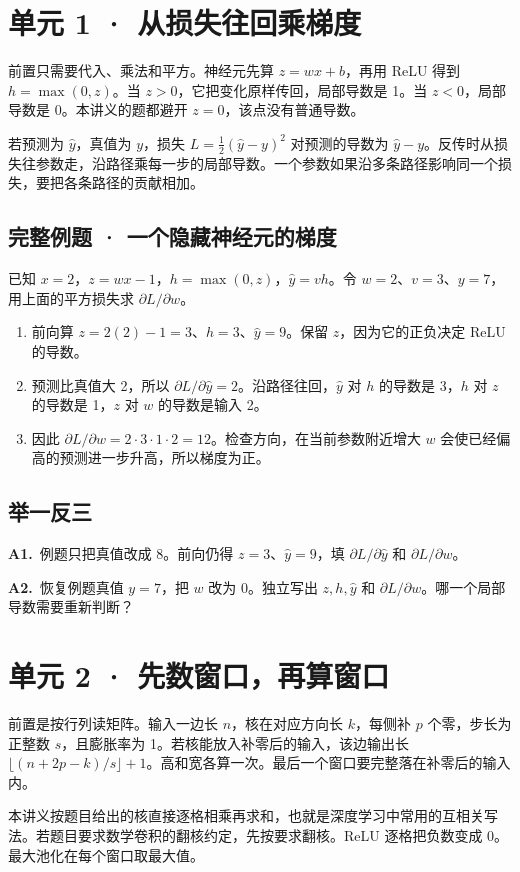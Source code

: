 \documentclass[UTF8,a4paper,11pt]{ctexart}
\newcommand{\PracticeQuestion}[3]{\par\Needspace{4\baselineskip}\noindent\begin{minipage}{\linewidth}\textbf{#1.}\ #2\par\noindent\rule{0pt}{#3mm}\par\end{minipage}\par}
\begin{document}
\clearpage
\section{单元 1 · 从损失往回乘梯度}
前置只需要代入、乘法和平方。神经元先算 $z=wx+b$，再用 ReLU 得到 $h=\max(0,z)$。当 $z>0$，它把变化原样传回，局部导数是 1。当 $z<0$，局部导数是 0。本讲义的题都避开 $z=0$，该点没有普通导数。

若预测为 $\hat y$，真值为 $y$，损失 $L=\frac12(\hat y-y)^2$ 对预测的导数为 $\hat y-y$。反传时从损失往参数走，沿路径乘每一步的局部导数。一个参数如果沿多条路径影响同一个损失，要把各条路径的贡献相加。

\subsection{完整例题 · 一个隐藏神经元的梯度}
已知 $x=2$，$z=wx-1$，$h=\max(0,z)$，$\hat y=vh$。令 $w=2$、$v=3$、$y=7$，用上面的平方损失求 $\partial L/\partial w$。

\begin{enumerate}
\item 前向算 $z=2(2)-1=3$、$h=3$、$\hat y=9$。保留 $z$，因为它的正负决定 ReLU 的导数。
\item 预测比真值大 2，所以 $\partial L/\partial\hat y=2$。沿路径往回，$\hat y$ 对 $h$ 的导数是 3，$h$ 对 $z$ 的导数是 1，$z$ 对 $w$ 的导数是输入 2。
\item 因此 $\partial L/\partial w=2\cdot3\cdot1\cdot2=12$。检查方向，在当前参数附近增大 $w$ 会使已经偏高的预测进一步升高，所以梯度为正。
\end{enumerate}
\subsection{举一反三}
\PracticeQuestion{A1}{例题只把真值改成 8。前向仍得 $z=3$、$\hat y=9$，填 $\partial L/\partial\hat y$ 和 $\partial L/\partial w$。}{23}
\PracticeQuestion{A2}{恢复例题真值 $y=7$，把 $w$ 改为 0。独立写出 $z,h,\hat y$ 和 $\partial L/\partial w$。哪一个局部导数需要重新判断？}{26}
\clearpage
\section{单元 2 · 先数窗口，再算窗口}
前置是按行列读矩阵。输入一边长 $n$，核在对应方向长 $k$，每侧补 $p$ 个零，步长为正整数 $s$，且膨胀率为 1。若核能放入补零后的输入，该边输出长 $\lfloor(n+2p-k)/s\rfloor+1$。高和宽各算一次。最后一个窗口要完整落在补零后的输入内。

本讲义按题目给出的核直接逐格相乘再求和，也就是深度学习中常用的互相关写法。若题目要求数学卷积的翻核约定，先按要求翻核。ReLU 逐格把负数变成 0。最大池化在每个窗口取最大值。
\end{document}
